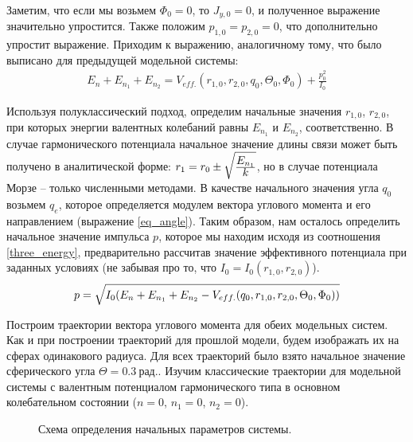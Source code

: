 Заметим, что если мы возьмем $\Phi_0 = 0$, то $J_{y, 0} = 0$, и полученное выражение значительно упростится. Также положим $p_{1,0} = p_{2,0} = 0$, что дополнительно упростит выражение.
Приходим к выражению, аналогичному тому, что было выписано для предыдущей модельной системы:
\vverh
\begin{gather}
E_n + E_{n_1} + E_{n_2} = V_{eff.}(r_{1,0}, r_{2,0}, q_0, \Theta_0, \Phi_0) + \frac{p_0^2}{I_0}
\label{three_energy}
\end{gather}

Используя полуклассический подход, определим начальные значения $r_{1, 0}$, $r_{2, 0}$, при которых энергии валентных колебаний равны $E_{n_1}$ и $E_{n_2}$, соответственно. В случае гармонического потенциала начальное значение длины связи может быть получено в аналитической форме:  $r_1 = r_0 \pm \sqrt{\frac{\displaystyle E_{n_1}}{\displaystyle k}}$, но в случае потенциала Морзе -- только численными методами. 
В качестве начального значения угла $q_0$ возьмем $q_e$, которое определяется модулем вектора углового момента и его направлением (выражение \eqref{eq_angle}). Таким образом, нам осталось определить начальное значение импульса $p$, которое мы находим исходя из соотношения \eqref{three_energy}, предварительно рассчитав значение эффективного потенциала при заданных условиях (не забывая про то, что $I_0 = I_0 (r_{1,0}, r_{2,0})$).
\vverh
\begin{gather}
p = \sqrt{I_0 (E_n + E_{n_1} + E_{n_2} - V_{eff.} (q_0, r_{1,0}, r_{2,0}, \Theta_0, \Phi_0))} \notag
\end{gather}

Построим траектории вектора углового момента для обеих модельных систем. Как и при построении траекторий для прошлой модели, будем изображать их на сферах одинакового радиуса. Для всех траекторий было взято начальное значение сферического угла $\Theta = 0.3 \ \textit{рад.}$. Изучим классические траектории для модельной системы с валентным потенциалом гармонического типа в основном колебательном состоянии ($n = 0$, $n_1 = 0$, $n_2 = 0$).

\vverh
\begin{figure}[H]
  \begin{center}
    \caption{Схема определения начальных параметров системы.}
  \end{center}
\end{figure}

